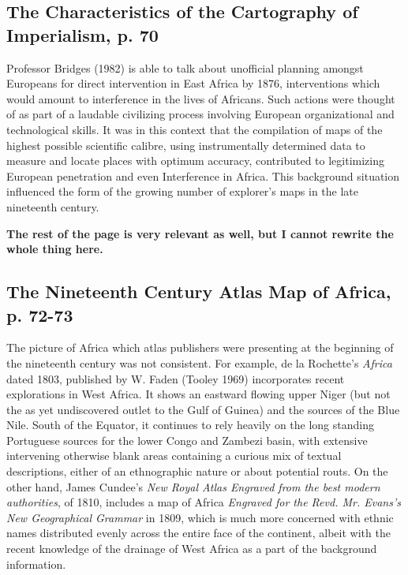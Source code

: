 \documentclass[12pt]{article}
\begin{document}
\subsection{The Characteristics of the Cartography of Imperialism, p. 70}

Professor Bridges (1982) is able to talk about unofficial planning amongst
Europeans for direct intervention in East Africa by 1876, interventions which
would amount to interference in the lives of Africans. Such actions were
thought of as part of a laudable civilizing process involving European
organizational and technological skills. It was in this context that the
compilation of maps of the highest possible scientific calibre, using
instrumentally determined data to measure and locate places with optimum
accuracy, contributed to legitimizing European penetration and even
Interference in Africa. This background situation influenced the form of the
growing number of explorer's maps in the late nineteenth century.

\textbf{The rest of the page is very relevant as well, but I cannot rewrite the
whole thing here.}

\subsection{The Nineteenth Century Atlas Map of Africa, p. 72-73}

The picture of Africa which atlas publishers were presenting at the beginning of
the nineteenth century was not consistent. For example, de la Rochette's
\textit{Africa} dated 1803, published by W. Faden (Tooley 1969) incorporates
recent explorations in West Africa. It shows an eastward flowing upper Niger
(but not the as yet undiscovered outlet to the Gulf of Guinea) and the sources
of the Blue Nile. South of the Equator, it continues to rely heavily on the long
standing Portuguese sources for the lower Congo and Zambezi basin, with
extensive intervening otherwise blank areas containing a curious mix of textual
descriptions, either of an ethnographic nature or about potential routs. On the
other hand, James Cundee's \textit{New Royal Atlas Engraved from the best
modern authorities}, of 1810, includes a map of Africa \textit{Engraved for the
Revd. Mr. Evans's New Geographical Grammar} in 1809, which is much more
concerned with ethnic names distributed evenly across the entire face of the
continent, albeit with the recent knowledge of the drainage of West Africa as a
part of the background information. 
\end{document}
